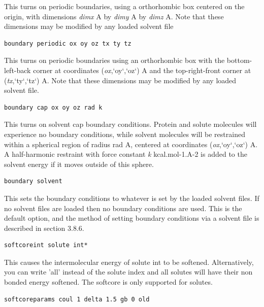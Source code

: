 \documentclass[letterpaper,10pt,english]{sphinxmanual}
\begin{document}
This turns on periodic boundaries, using a orthorhombic box centered on the origin, with dimensions \emph{dimx} A by \emph{dimy} A by \emph{dimz} A. Note that these dimensions may be modified by any loaded solvent file

\begin{Verbatim}[commandchars=\\\{\}]
boundary periodic ox oy oz tx ty tz
\end{Verbatim}

This turns on periodic boundaries using an orthorhombic box with the bottom-left-back corner at coordinates (\emph{ox},{}`oy{}`,{}`oz{}`) A and the top-right-front corner at (\emph{tx},{}`ty{}`,{}`tz{}`) A. Note that these dimensions may be modified by any loaded solvent file.

\begin{Verbatim}[commandchars=\\\{\}]
boundary cap ox oy oz rad k
\end{Verbatim}

This turns on solvent cap boundary conditions. Protein and solute molecules will experience no boundary conditions, while solvent molecules will be restrained within a spherical region of radius rad A, centered at coordinates (\emph{ox},{}`oy{}`,{}`oz{}`) A. A half-harmonic restraint with force constant \emph{k} kcal.mol-1.A-2 is added to the solvent energy if it moves outside of this sphere.

\begin{Verbatim}[commandchars=\\\{\}]
boundary solvent
\end{Verbatim}

This sets the boundary conditions to whatever is set by the loaded solvent files. If no solvent files are loaded then no boundary conditions are used. This is the default option, and the method of setting boundary conditions via a solvent file is described in section 3.8.6.

\begin{Verbatim}[commandchars=\\\{\}]
softcoreint solute int*
\end{Verbatim}

This causes the intermolecular energy of solute int to be softened. Alternatively, you can write ’all’ instead of the solute index and all solutes will have their non bonded energy softened. The softcore is only supported for solutes.

\begin{Verbatim}[commandchars=\\\{\}]
softcoreparams coul 1 delta 1.5 gb 0 old
\end{Verbatim}
\end{document}
